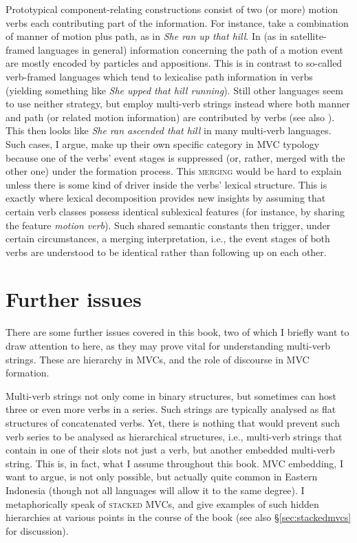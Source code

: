 Prototypical component-relating constructions consist of two (or more) motion verbs each contributing part of the information. For instance, take a combination of manner of motion plus path, as in \textit{She ran up that hill}. In  (as in satellite-framed languages in general) information concerning the path of a motion event are mostly encoded by particles and appositions. This is in contrast to so-called verb-framed languages which tend to lexicalise path information in verbs (yielding something like \textit{She upped that hill running}). Still other languages seem to use neither strategy, but employ multi-verb strings instead where both manner and path (or related motion information) are contributed by verbs (see also \citealt{Ameka2013}). This then looks like \textit{She ran ascended that hill} in many multi-verb languages. Such cases, I argue, make up their own specific category in MVC typology because one of the verbs' event stages is suppressed (or, rather, merged with the other one) under the formation process. This \textsc{merging} would be hard to explain unless there is some kind of driver inside the verbs' lexical structure. This is exactly where lexical decomposition provides new insights by assuming that certain verb classes possess identical sublexical features (for instance, by sharing the feature \textit{motion verb}). Such shared semantic constants then trigger, under certain circumstances, a merging interpretation, i.e., the event stages of both verbs are understood to be identical rather than following up on each other.

\section*{Further issues}

There are some further issues covered in this book, two of which I briefly want to draw attention to here, as they may prove vital for understanding multi-verb strings. These are hierarchy in MVCs, and the role of discourse in MVC formation.

Multi-verb strings not only come in binary structures, but sometimes can host three or even more verbs in a series. Such strings are typically analysed as flat structures of concatenated verbs. Yet, there is nothing that would prevent such verb series to be analysed as hierarchical structures, i.e., multi-verb strings that contain in one of their slots not just a verb, but another embedded multi-verb string. This is, in fact, what I assume throughout this book. MVC embedding, I want to argue, is not only possible, but actually quite common in Eastern Indonesia (though not all languages will allow it to the same degree). I metaphorically speak of \textsc{stacked MVC}s, and give examples of such hidden hierarchies at various points in the course of the book (see also §\ref{sec:stackedmvcs} for discussion).

